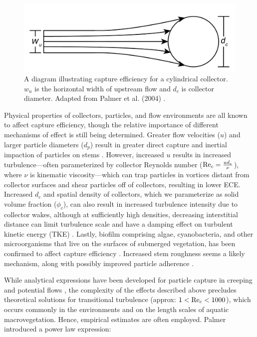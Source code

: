 \documentclass[geosciences,article,submit,moreauthors,pdftex]{Definitions/mdpi}
\begin{document}
\begin{figure}[H]
\includegraphics[width=5in]{../pics/collectorefficiency.png}
\centering
\caption{A diagram illustrating capture efficiency for a cylindrical collector. $w_u$ is the horizontal width of upstream flow and $d_c$ is collector diameter. Adapted from Palmer et al. (2004) \cite{Palmer_2004}.}
\label{fig:capeff}
\end{figure}

Physical properties of collectors, particles, and flow environments are all known to affect capture efficiency, though the relative importance of different mechanisms of effect is still being determined. Greater flow velocities ($u$) and larger particle diameters ($d_p$) result in greater direct capture and inertial impaction of particles on stems \cite{Palmer_2004,fuchs1965mechanics}. However, increased $u$ results in increased turbulence---often parameterized by collector Reynolds number ($\mathrm{Re}_c=\frac{ud_c}{\nu}$), where $\nu$ is kinematic viscosity---which can trap particles in vortices distant from collector surfaces and shear particles off of collectors, resulting in lower ECE. Increased $d_c$ and spatial density of collectors, which we parameterize as solid volume fraction ($\phi_c$), can also result in increased turbulence intensity due to collector wakes, although at sufficiently high densities, decreasing interstitial distance can limit turbulence scale and have a damping effect on turbulent kinetic energy (TKE) \cite{nepf_drag_1999}. Lastly, biofilm comprising algae, cyanobacteria, and other microorganisms that live on the surfaces of submerged vegetation, has been confirmed to affect capture efficiency \cite{Fauria_2015}. Increased stem roughness \cite{Palmer_2004} seems a likely mechanism, along with possibly improved particle adherence \cite{wu2014colloid}.

While analytical expressions have been developed for particle capture in creeping and potential flows \cite{lamb1932, langmuir1942filtration, fuchs1965mechanics}, the complexity of the effects described above precludes theoretical solutions for transitional turbulence (approx: $1<\mathrm{Re}_c<1000$), which occurs commonly in the environments and on the length scales of aquatic macrovegetation. Hence, empirical estimates are often employed. Palmer \cite{Palmer_2004} introduced a power law expression:
\end{document}
